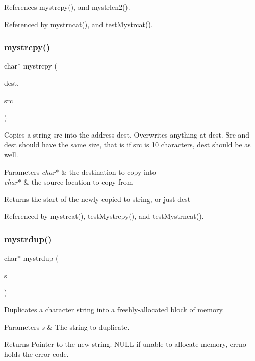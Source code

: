 References mystrcpy(), and mystrlen2().



Referenced by mystrncat(), and test\+Mystrcat().

\mbox{\label{mystring_8c_acce8ca34ad672c764b2817e5f91707d6}} 
\subsubsection{mystrcpy()}
{\footnotesize\ttfamily char$\ast$ mystrcpy (\begin{DoxyParamCaption}\item[{char $\ast$}]{dest,  }\item[{char $\ast$}]{src }\end{DoxyParamCaption})}

Copies a string src into the address dest. Overwrites anything at dest. Src and dest should have the same size, that is if src is 10 characters, dest should be as well. 
\begin{DoxyParams}{Parameters}
{\em char$\ast$} & the destination to copy into \\
\hline
{\em char$\ast$} & the source location to copy from \\
\hline
\end{DoxyParams}
\begin{DoxyReturn}{Returns}
the start of the newly copied to string, or just dest 
\end{DoxyReturn}


Referenced by mystrcat(), test\+Mystrcpy(), and test\+Mystrncat().

\mbox{\label{mystring_8c_afd0ffd16b17423165bbba7ccadac9375}} 
\subsubsection{mystrdup()}
{\footnotesize\ttfamily char$\ast$ mystrdup (\begin{DoxyParamCaption}\item[{char $\ast$}]{s }\end{DoxyParamCaption})}

Duplicates a character string into a freshly-\/allocated block of memory. 
\begin{DoxyParams}{Parameters}
{\em s} & The string to duplicate. \\
\hline
\end{DoxyParams}
\begin{DoxyReturn}{Returns}
Pointer to the new string. N\+U\+LL if unable to allocate memory, errno holds the error code. 
\end{DoxyReturn}


